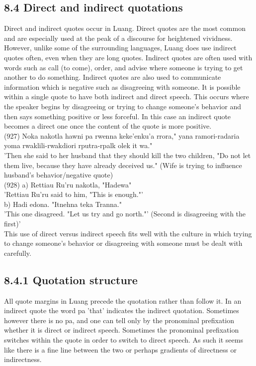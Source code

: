 \documentclass[10pt]{article}
\begin{document}
\subsection*{8.4 Direct and indirect quotations}
Direct and indirect quotes occur in Luang. Direct quotes are the most common and are especially used at the peak of a discourse for heightened vividness. However, unlike some of the surrounding languages, Luang does use indirect quotes often, even when they are long quotes. Indirect quotes are often used with words such as call (to come), order, and advise where someone is trying to get another to do something. Indirect quotes are also used to communicate information which is negative such as disagreeing with someone. It is possible within a single quote to have both indirect and direct speech. This occurs where the speaker begins by disagreeing or trying to change someone's behavior and then says something positive or less forceful. In this case an indirect quote becomes a direct one once the content of the quote is more positive.\\
(927) Noka nakotla hawni pa rwenna keke'enku'a rrora," yana ramori-radaria yoma rwaklili-rwakdiori rputra-rpalk olek it wa."\\
'Then she said to her husband that they should kill the two children, "Do not let them live, because they have already deceived us." (Wife is trying to influence husband's behavior/negative quote)\\
(928) a) Rettiau Ru'ru nakotla, "Hadewa"\\
'Rettiau Ru'ru said to him, "This is enough."'\\
b) Hadi edona. "Itnehna teka Tranna."\\
'This one disagreed. "Let us try and go north."' (Second is disagreeing with the first)'\\
This use of direct versus indirect speech fits well with the culture in which trying to change someone's behavior or disagreeing with someone must be dealt with carefully.

\subsection*{8.4.1 Quotation structure}
All quote margins in Luang precede the quotation rather than follow it. In an indirect quote the word pa 'that' indicates the indirect quotation. Sometimes however there is no pa, and one can tell only by the pronominal prefixation whether it is direct or indirect speech. Sometimes the pronominal prefixation switches within the quote in order to switch to direct speech. As such it seems like there is a fine line between the two or perhaps gradients of directness or indirectness.
\end{document}
